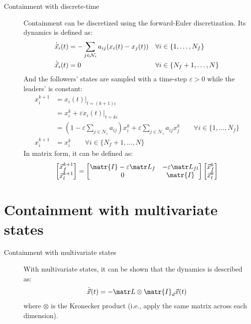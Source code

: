 \begin{description}
    \item[Containment with discrete-time] 
        Containment can be discretized using the forward-Euler discretization. Its dynamics is defined as:
        \[
            \begin{aligned}
                \dot{{\vec{x}}}_i(t) &= - \sum_{j \in \mathcal{N}_i} a_{ij} (x_i(t) - x_j(t)) & & \forall i \in \{1, \dots, N_f\} \\
                \dot{{\vec{x}}}_i(t) &= 0 & & \forall i \in \{N_f+1, \dots, N\}
            \end{aligned}
        \]
        And the followers' states are sampled with a time-step $\varepsilon > 0$ while the leaders' is constant:
        \[
            \begin{split}
                x_i^{k+1} &= \left.x_i(t)\right|_{t=(k+1)\varepsilon} \\
                &= x_i^k + \varepsilon \left.\dot{x}_i(t)\right|_{t=k\varepsilon} \\
                &= \left( 1 - \varepsilon\sum_{j \in \mathcal{N}_i} a_{ij} \right) x_i^{k} + \varepsilon \sum_{j \in \mathcal{N}_i} a_{ij} x_j^k \qquad \forall i \in \{ 1, \dots, N_f \} \\
                x_i^{k+1} &= x_i^k \qquad \forall i \in \{ N_f+1, \dots, N \}
            \end{split}
        \]
        In matrix form, it can be defined as:
        \[
            \begin{bmatrix}
                \x_f^{k+1} \\ \x_l^{k+1} 
            \end{bmatrix}
            =
            \begin{bmatrix}
                \matr{I} - \varepsilon \lap_f & -\varepsilon \lap_{fl} \\
                0 & \matr{I}
            \end{bmatrix}
            \begin{bmatrix}
                \x_f^k \\ \x_l^k
            \end{bmatrix}
        \]
\end{description}



\section{Containment with multivariate states}

\begin{description}
    \item[Containment with multivariate states]  
        With multivariate states, it can be shown that the dynamics is described as:
        \[
            \dot{\x}(t) = - \lap \otimes \matr{I}_d \x(t)
        \]
        where $\otimes$ is the Kronecker product (i.e., apply the same matrix across each dimension).
\end{description}